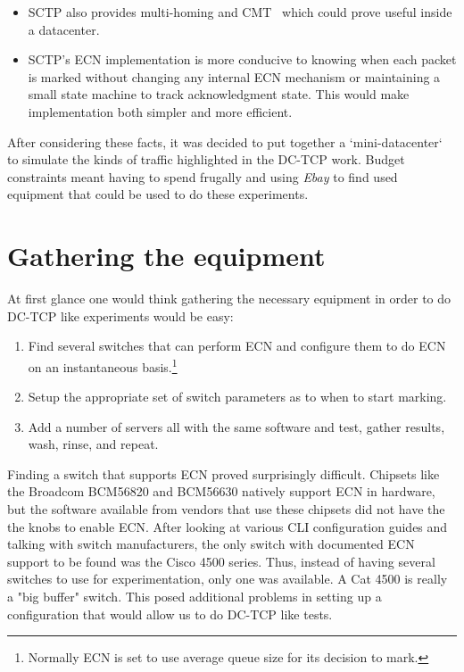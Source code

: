 \documentclass[12pt]{article}
\begin{document}
\begin{enumerate}
\begin{itemize}
\item SCTP also provides multi-homing and CMT~\cite{jana} which could prove useful inside a datacenter.

\item SCTP's ECN implementation is more conducive to knowing when each packet is marked without
      changing any internal ECN mechanism or maintaining a small state machine to track acknowledgment state. 
      This would make implementation both simpler and more efficient.
\end{itemize}

\end{enumerate}

After considering these facts, it was decided to put together a `mini-datacenter` to simulate the
kinds of traffic highlighted in the DC-TCP work. Budget constraints meant having to spend frugally and 
using \emph{Ebay} to find used equipment that could be used to do these experiments.

\section{Gathering the equipment}

At first glance one would think gathering the necessary equipment in order to do DC-TCP like
experiments would be easy:
\begin{enumerate}
\item Find several switches that can perform ECN and configure them
to do ECN on an instantaneous basis.\footnote{Normally ECN is set to use average queue size
for its decision to mark.}

\item Setup the appropriate set of switch parameters as to when to start
marking. 

\item Add a number of servers all with the same software and test, gather results, wash, rinse, and repeat.
\end{enumerate}

Finding a switch that supports ECN proved surprisingly difficult.  
Chipsets like the Broadcom BCM56820 and BCM56630 natively support 
ECN in hardware,  but the software available from vendors that use
these chipsets did not have the the knobs to enable ECN. After looking at various CLI
configuration guides and talking with switch manufacturers, the only switch with documented
ECN support to be found was the Cisco 4500 series. Thus, instead of having several switches
to use for experimentation, only one was available. A Cat 4500 is really a "big buffer"
switch. This posed additional problems in setting up a configuration
that would allow us to do DC-TCP like tests.
\end{document}
